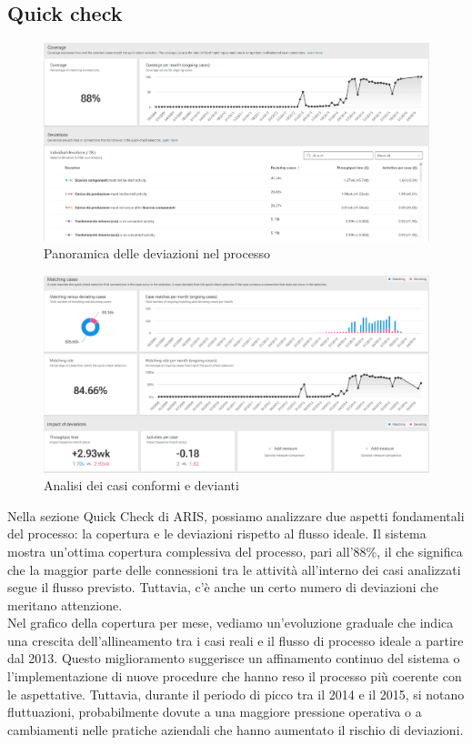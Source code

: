 \documentclass{article}
\begin{document}
\subsection{Quick check}
\begin{figure}[H]
    \centering
    \includegraphics[width=\textwidth]{imgARIS/DatiReali/QuickCheck1DatiReali.png}
    \caption{Panoramica delle deviazioni nel processo}
    \label{fig:quick-check-1}
\end{figure}
\begin{figure}[H]
    \centering
    \includegraphics[width=\textwidth]{imgARIS/DatiReali/QuickCheck2DatiReali.png}
    \caption{Analisi dei casi conformi e devianti}
    \label{fig:quick-check-2}
\end{figure}
Nella sezione Quick Check di ARIS, possiamo analizzare due aspetti fondamentali del processo: la copertura e le deviazioni rispetto al flusso ideale. Il sistema mostra un'ottima copertura complessiva del processo, pari all'88\%, il che significa che la maggior parte delle connessioni tra le attività all'interno dei casi analizzati segue il flusso previsto. Tuttavia, c'è anche un certo numero di deviazioni che meritano attenzione.\\
Nel grafico della copertura per mese, vediamo un'evoluzione graduale che indica una crescita dell'allineamento tra i casi reali e il flusso di processo ideale a partire dal 2013. Questo miglioramento suggerisce un affinamento continuo del sistema o l'implementazione di nuove procedure che hanno reso il processo più coerente con le aspettative. Tuttavia, durante il periodo di picco tra il 2014 e il 2015, si notano fluttuazioni, probabilmente dovute a una maggiore pressione operativa o a cambiamenti nelle pratiche aziendali che hanno aumentato il rischio di deviazioni.\\
\end{document}
